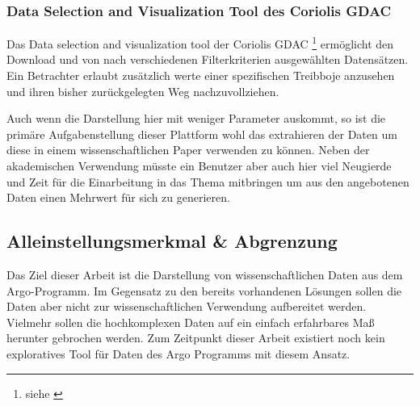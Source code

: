 \subsubsection{Data Selection and Visualization Tool des Coriolis GDAC}
    
    Das Data selection and visualization tool der Coriolis GDAC \footnote { siehe \cite{ArgoDataSelection}} ermöglicht den Download und von nach verschiedenen Filterkriterien ausgewählten Datensätzen. Ein Betrachter erlaubt zusätzlich werte einer spezifischen Treibboje anzusehen und ihren bisher zurückgelegten Weg nachzuvollziehen.
    
    Auch wenn die Darstellung hier mit weniger Parameter auskommt, so ist die primäre Aufgabenstellung dieser Plattform wohl das extrahieren der Daten um diese in einem wissenschaftlichen Paper verwenden zu können. Neben der akademischen Verwendung müsste ein Benutzer aber auch hier viel Neugierde und Zeit für die Einarbeitung in das Thema mitbringen um aus den angebotenen Daten einen Mehrwert für sich zu generieren. 
    
    
\subsection{Alleinstellungsmerkmal \& Abgrenzung}
    
    Das Ziel dieser Arbeit ist die Darstellung von wissenschaftlichen Daten aus dem Argo-Programm. Im Gegensatz zu den bereits vorhandenen Lösungen sollen die Daten aber nicht zur wissenschaftlichen Verwendung aufbereitet werden. Vielmehr sollen die hochkomplexen Daten auf ein einfach erfahrbares Maß herunter gebrochen werden. Zum Zeitpunkt dieser Arbeit existiert noch kein exploratives Tool für Daten des Argo Programms mit diesem Ansatz.
    

